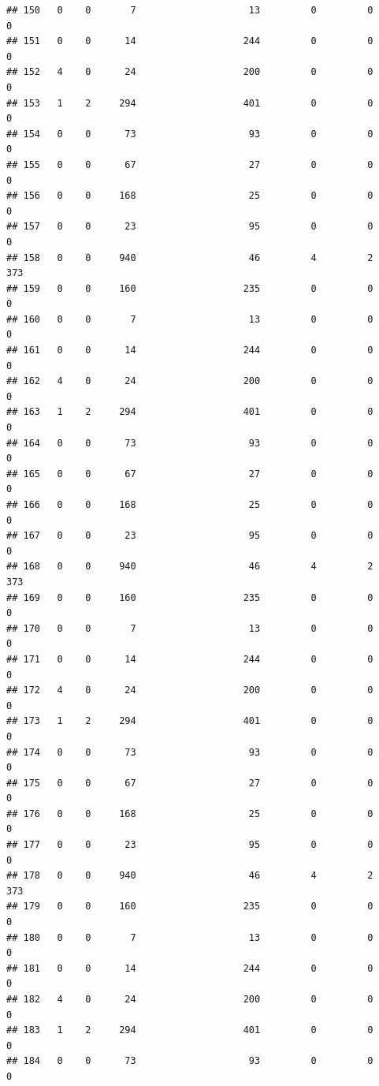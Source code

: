 \documentclass[
]{article}
\begin{document}
\begin{verbatim}
## 150   0    0       7                    13         0         0        0
## 151   0    0      14                   244         0         0        0
## 152   4    0      24                   200         0         0        0
## 153   1    2     294                   401         0         0        0
## 154   0    0      73                    93         0         0        0
## 155   0    0      67                    27         0         0        0
## 156   0    0     168                    25         0         0        0
## 157   0    0      23                    95         0         0        0
## 158   0    0     940                    46         4         2      373
## 159   0    0     160                   235         0         0        0
## 160   0    0       7                    13         0         0        0
## 161   0    0      14                   244         0         0        0
## 162   4    0      24                   200         0         0        0
## 163   1    2     294                   401         0         0        0
## 164   0    0      73                    93         0         0        0
## 165   0    0      67                    27         0         0        0
## 166   0    0     168                    25         0         0        0
## 167   0    0      23                    95         0         0        0
## 168   0    0     940                    46         4         2      373
## 169   0    0     160                   235         0         0        0
## 170   0    0       7                    13         0         0        0
## 171   0    0      14                   244         0         0        0
## 172   4    0      24                   200         0         0        0
## 173   1    2     294                   401         0         0        0
## 174   0    0      73                    93         0         0        0
## 175   0    0      67                    27         0         0        0
## 176   0    0     168                    25         0         0        0
## 177   0    0      23                    95         0         0        0
## 178   0    0     940                    46         4         2      373
## 179   0    0     160                   235         0         0        0
## 180   0    0       7                    13         0         0        0
## 181   0    0      14                   244         0         0        0
## 182   4    0      24                   200         0         0        0
## 183   1    2     294                   401         0         0        0
## 184   0    0      73                    93         0         0        0

\end{verbatim}
\end{document}
